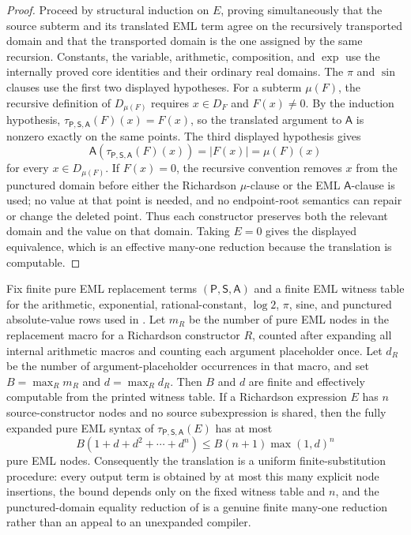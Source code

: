 \begin{proof}
Proceed by structural induction on \(E\), proving simultaneously that the source
subterm and its translated EML term agree on the recursively transported domain
and that the transported domain is the one assigned by the same recursion.
Constants, the variable, arithmetic, composition, and \(\exp\) use the internally
proved core identities and their ordinary real domains.  The \(\pi\) and \(\sin\)
clauses use the first two displayed hypotheses.  For a subterm \(\mu(F)\), the
recursive definition of \(D_{\mu(F)}\) requires \(x\in D_F\) and \(F(x)\ne0\).  By
the induction
hypothesis,
\(\tau_{\mathsf P,\mathsf S,\mathsf A}(F)(x)=F(x)\), so the translated argument to
\(\mathsf A\) is nonzero exactly on the same points.  The third displayed
hypothesis gives
\[
  \mathsf A(\tau_{\mathsf P,\mathsf S,\mathsf A}(F)(x))
  =|F(x)|=
  \mu(F)(x)
\]
for every \(x\in D_{\mu(F)}\).  If \(F(x)=0\), the recursive convention removes
\(x\) from the punctured domain before either the Richardson \(\mu\)-clause or the
EML \(\mathsf A\)-clause is used; no value at that point is needed, and no
endpoint-root semantics can repair or change the deleted point.  Thus each
constructor preserves both the relevant domain and the value on that domain.
Taking \(E=0\) gives the displayed equivalence, which is an effective many-one
reduction because the translation is computable.
\end{proof}
\begin{theorem}
\label{thm:richardson-translation-budget}
\label{lem:richardson-translation-bookkeeping}
Fix finite pure EML replacement terms \((\mathsf P,\mathsf S,\mathsf A)\) and a
finite EML witness table for the arithmetic, exponential, rational-constant,
\(\log2\), \(\pi\), sine, and punctured absolute-value rows used in
.  Let \(m_R\) be the number of pure EML nodes
in the replacement macro for a Richardson constructor \(R\), counted after
expanding all internal arithmetic macros and counting each argument placeholder
once.  Let \(d_R\) be the number of argument-placeholder occurrences in that
macro, and set \(B=\max_R m_R\) and \(d=\max_R d_R\).
Then \(B\) and \(d\) are finite and effectively computable from the printed
witness table.  If a Richardson expression \(E\) has \(n\) source-constructor
nodes and no source subexpression is shared, then the fully expanded pure EML
syntax of \(\tau_{\mathsf P,\mathsf S,\mathsf A}(E)\) has at most
\[
  B(1+d+d^2+\cdots+d^n)\le B(n+1)\max(1,d)^n
\]
pure EML nodes.  Consequently the translation is a uniform finite-substitution
procedure: every output term is obtained by at most this many explicit node
insertions, the bound depends only on the fixed witness table and \(n\), and the
punctured-domain equality reduction of
 is a genuine finite many-one
reduction rather than an appeal to an unexpanded compiler.
\end{theorem}

